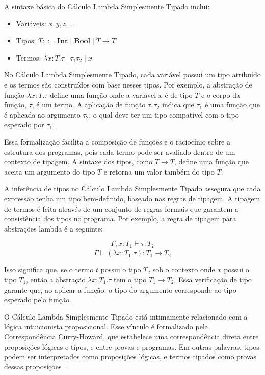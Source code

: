 A sintaxe básica do Cálculo Lambda Simplesmente Tipado inclui:

\begin{itemize}
  \item Variáveis: $x, y, z, \ldots$
  \item Tipos: $T ::= \mathbf{Int} \mid \mathbf{Bool} \mid T \to T$
  \item Termos: $\lambda x:T. \tau \mid \tau_1 \tau_2 \mid x$
\end{itemize}

No Cálculo Lambda Simplesmente Tipado, cada variável possui um tipo atribuído e os termos são construídos com base nesses tipos.
Por exemplo, a abstração de função $\lambda x:T. \tau$ define uma função onde a variável $x$ é de tipo $T$ e o corpo da função, $\tau$, é um termo.
A aplicação de função $\tau_1 \tau_2$ indica que $\tau_1$ é uma função que é aplicada ao argumento $\tau_2$, o qual deve ter um tipo compatível com o tipo esperado por $\tau_1$.

Essa formalização facilita a composição de funções e o raciocínio sobre a estrutura dos programas, pois cada termo pode ser avaliado dentro de um contexto de tipagem.
A sintaxe dos tipos, como $T \to T$, define uma função que aceita um argumento do tipo $T$ e retorna um valor também do tipo $T$.

A inferência de tipos no Cálculo Lambda Simplesmente Tipado assegura que cada expressão tenha um tipo bem-definido, baseado nas regras de tipagem.
A tipagem de termos é feita através de um conjunto de regras formais que garantem a consistência dos tipos no programa.
Por exemplo, a regra de tipagem para abstrações lambda é a seguinte:

\[
  \frac{\Gamma, x:T_1 \vdash \tau:T_2}{\Gamma \vdash (\lambda x:T_1. \tau): T_1 \to T_2}
\]

Isso significa que, se o termo $t$ possui o tipo $T_2$ sob o contexto onde $x$ possui o tipo $T_1$, então a abstração $\lambda x:T_1. \tau$ tem o tipo $T_1 \to T_2$.
Essa verificação de tipo garante que, ao aplicar a função, o tipo do argumento corresponde ao tipo esperado pela função.

O Cálculo Lambda Simplesmente Tipado está intimamente relacionado com a lógica intuicionista proposicional.
Esse vínculo é formalizado pela Correspondência Curry-Howard, que estabelece uma correspondência direta entre proposições lógicas e tipos, e entre provas e programas.
Em outras palavras, tipos podem ser interpretados como proposições lógicas, e termos tipados como provas dessas proposições~\cite{PIERCE2002}.

